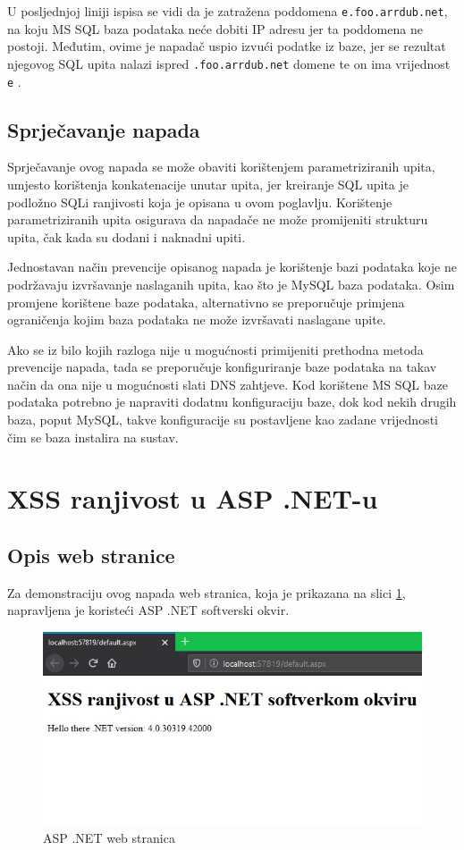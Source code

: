 \documentclass[12pt, oneside, onecolumn]{book}
\begin{document}
{U posljednjoj liniji ispisa se vidi da je zatražena poddomena \texttt{e.foo.arrdub.net}, na koju MS SQL baza podataka neće dobiti IP adresu jer ta poddomena ne postoji. Međutim, ovime je napadač uspio izvući podatke iz baze, jer se rezultat njegovog SQL upita nalazi ispred \texttt{.foo.arrdub.net} domene te on ima vrijednost \texttt{e} \cite{dnsextr}.

\subsection{Sprječavanje napada}
Sprječavanje ovog napada se može obaviti korištenjem parametriziranih upita, umjesto korištenja konkatenacije unutar upita, jer kreiranje SQL upita je podložno SQLi ranjivosti koja je opisana u ovom poglavlju. Korištenje parametriziranih upita osigurava da napadače ne može promijeniti strukturu upita, čak kada su dodani i naknadni upiti.

Jednostavan način prevencije opisanog napada je korištenje bazi podataka koje ne podržavaju izvršavanje naslaganih upita, kao što je MySQL baza podataka. Osim promjene korištene baze podataka, alternativno se preporučuje primjena ograničenja kojim baza podataka ne može izvršavati naslagane upite.

Ako se iz bilo kojih razloga nije u mogućnosti primijeniti prethodna metoda prevencije napada, tada se preporučuje konfiguriranje baze podataka na takav način da ona nije u mogućnosti slati DNS zahtjeve. Kod korištene MS SQL baze podataka potrebno je napraviti dodatnu konfiguraciju baze, dok kod nekih drugih baza, poput MySQL, takve konfiguracije su postavljene kao zadane vrijednosti čim se baza instalira na sustav.

\section{XSS ranjivost u ASP .NET-u} \label{xss2}
\subsection{Opis web stranice}
Za demonstraciju ovog napada web stranica, koja je prikazana na slici \ref{fig:asp}, napravljena je koristeći ASP .NET softverski okvir.

\begin{figure}[H]
	\begin{center}
		\includegraphics[width=\textwidth]{asp.jpg}
		\caption{ASP .NET web stranica} \label{fig:asp}
	\end{center}
\end{figure}

}
\end{document}
